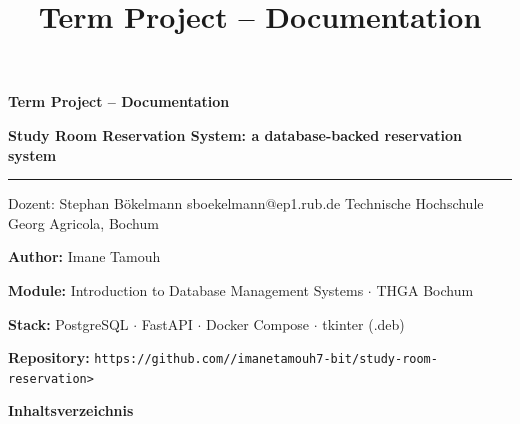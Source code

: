 \documentclass[10pt,a4paper]{article}
\title{
	\textcolor{THGABlue}{
		\textbf{Term Project -- Documentation}
	}
}
\author{}
\date{}
\begin{document}
	
	
	\thispagestyle{empty}
	
	\begin{tcolorbox}[
		colback=THGADarkBlue,
		colframe=THGADarkBlue,
		boxrule=0pt,
		arc=0pt,
		left=8pt,
		right=8pt,
		top=8pt,
		bottom=8pt
		]
		\centering
		{\Large\color{white}\textbf{Term Project -- Documentation}}
	\end{tcolorbox}
	
	\vspace{7mm}
	
	{\large
		\textcolor{THGABlue}{
			\textbf{Study Room Reservation System: a database-backed reservation system}
		}
	}
	
	\vspace{6mm}
	
	\textcolor{THGARed}{\rule{\textwidth}{1.5pt}}
	
	\vspace{6mm}
	
	\noindent
	Dozent: Stephan Bökelmann
	\hspace{5mm}
	\textcolor{THGARed}{sboekelmann@ep1.rub.de}
	\hspace{5mm}
	Technische Hochschule Georg Agricola, Bochum
	
	\vspace{7mm}
	
	\begin{infobox}
		
		\textbf{Author:} Imane Tamouh
		
		\textbf{Module:} Introduction to Database Management Systems
		$\cdot$ THGA Bochum
		
		\textbf{Stack:} PostgreSQL $\cdot$ FastAPI $\cdot$
		Docker Compose $\cdot$ tkinter (.deb)
		
		\textbf{Repository:}
		\textcolor{THGARed}{
			\texttt{https://github.com//imanetamouh7-bit/study-room-reservation>}
		}
		
	\end{infobox}
	
	\vspace{7mm}
	
	
	{\large\bfseries\textcolor{THGABlue}{Inhaltsverzeichnis}}
	
\end{document}
